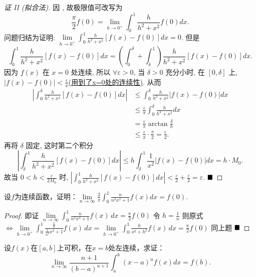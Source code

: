 \documentclass[lang=cn,newtx,10pt,scheme=chinese]{elegantbook}
\begin{document}
\begin{proof}[证 II (拟合法)]
因 , 故极限值可改写为
$$ \frac{\pi}{2}f(0) = \lim_{h \to 0^+} \int_{0}^{1} \frac{h}{h^2+x^2}f(0)dx. $$
问题归结为证明: $\lim\limits_{h \to 0^+} \int_{0}^{1} \frac{h}{h^2+x^2}[f(x)-f(0)]dx = 0$. 但是
$$ \int_{0}^{1} \frac{h}{h^2+x^2}[f(x)-f(0)]dx = \left(\int_{0}^{\delta} + \int_{\delta}^{1}\right) \frac{h}{h^2+x^2}[f(x)-f(0)]dx. $$
因为 $f(x)$ 在 $x=0$ 处连续, 所以 $\forall \varepsilon > 0$, 当 $\delta > 0$ 充分小时, 在 $[0, \delta]$ 上, $|f(x)-f(0)| < \frac{\varepsilon}{\pi}$\underline{(用到了x=0处的连续性)}. 从而
\begin{align*} \left| \int_{0}^{\delta} \frac{h}{h^2+x^2}[f(x)-f(0)]dx \right| &\le \int_{0}^{\delta} \frac{h}{h^2+x^2}|f(x)-f(0)|dx \\ &\le \frac{\varepsilon}{\pi} \int_{0}^{\delta} \frac{h}{h^2+x^2}dx \\ &= \frac{\varepsilon}{\pi} \arctan \frac{\delta}{h} \\ &\le \frac{\varepsilon}{\pi} \cdot \frac{\pi}{2} = \frac{\varepsilon}{2}. \end{align*}
再将 $\delta$ 固定, 这时第二个积分
$$ \left| \int_{\delta}^{1} \frac{h}{h^2+x^2}[f(x)-f(0)]dx \right| \le h \int_{\delta}^{1} \frac{1}{x^2}|f(x)-f(0)|dx = h \cdot M_0. $$
故当 $0 < h < \frac{\varepsilon}{2M_0}$ 时, $\left| \int_{0}^{1} \frac{h}{h^2+x^2}[f(x)-f(0)]dx \right| < \frac{\varepsilon}{2} + \frac{\varepsilon}{2} = \varepsilon$. 
$\hfill \blacksquare$
\end{proof}

\begin{exercise}
设$f$为连续函数，证明：$\lim\limits_{n \to \infty} \frac{2}{\pi} \int_{0}^{1} \frac{n}{n^2x^2+1} f(x) dx = f(0)$. 
\end{exercise}

\begin{proof}
即证 $\lim\limits_{n \to \infty} \int_0^1 \frac{n}{n^2x^2+1} f(x) \,dx = \frac{\pi}{2} f(0)$
令 $h = \frac{1}{n}$
则原式 $\Leftrightarrow \lim\limits_{h \to 0^+} \int_0^1 \frac{\frac{1}{h}}{\frac{1}{h^2}x^2+1} f(x) \,dx = \lim\limits_{h \to 0^+} \int_0^1 \frac{h}{x^2+h^2} f(x) \,dx = \frac{\pi}{2} f(0)$
同上题
$\hfill \blacksquare$
\end{proof}

\begin{exercise}\label{eg:4.1.5_2}
设$f(x)$在$[a,b]$上可积，在$x=b$处左连续，求证：
$$ \lim\limits_{n \to \infty} \frac{n+1}{(b-a)^{n+1}} \int_{a}^{b} (x-a)^n f(x) dx = f(b). $$
\end{exercise}
\end{document}
